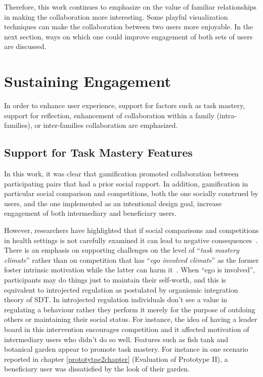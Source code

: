Therefore, this work continues to emphasize on the value of familiar relationships in making the collaboration more interesting. Some playful visualization techniques can make the collaboration between two users more enjoyable. In the next section, ways on which one could improve engagement of both sets of users are discussed.

\section{Sustaining Engagement}
In order to enhance user experience, support for factors such as task mastery, support for reflection, enhancement of collaboration within a family (intra-families), or inter-families collaboration are emphasized.
\subsection{Support for Task Mastery Features}
In this work, it was clear that gamification promoted collaboration between participating pairs that had a prior social rapport. In addition, gamification in particular social comparison and competitions, both the one socially construed by users, and the one implemented as an intentional design goal,   increase engagement of both intermediary and beneficiary users.

However, researchers have highlighted that if social comparisons and competitions in health settings is not carefully examined it can lead to negative consequences~\citep{grimes2009toward}. There is an emphasis on supporting challenges on the level of ``\emph{task mastery climate}'' rather than on competition that has ``\emph{ego involved climate}'' as the  former foster intrinsic motivation while the latter can harm it~\citep{saksono2015spaceship}. When ``ego is involved'', participants may do things just to maintain their self-worth, and this is equivalent to introjected regulation as postulated by organismic integration theory of SDT\citep{ryan2000:self}. In introjected regulation individuals don't see a value in regulating a behaviour rather they perform it merely for the purpose of outdoing others or maintaining their social status. For instance, the idea of having a leader board in this intervention encourages competition and it affected motivation of intermediary users who didn't do so well. Features such as fish tank and botanical garden appear to promote task mastery. For instance in one scenario reported in chapter \ref{prototytpe2chapter} (Evaluation of Prototype II),  a beneficiary user was dissatisfied by the look of their garden.

